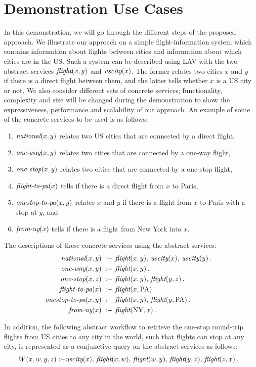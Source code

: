 \documentclass{llncs}
\newcommand{\qrule}{:\!\!-}
\newcommand{\flight}{\text{\it flight}}
\newcommand{\UScity}{\text{\it uscity}}
\newcommand{\national}{\text{\it national}}
\newcommand{\oneway}{\text{\it one-way}}
\newcommand{\onestop}{\text{\it one-stop}}
\newcommand{\flightPA}{\text{\it flight-to-pa}}
\newcommand{\onestopPA}{\text{\it onestop-to-pa}}
\newcommand{\fromNY}{\text{\it from-ny}}
\newcommand{\PA}{\text{PA}}
\newcommand{\NY}{\text{NY}}
\begin{document}
\section{Demonstration Use Cases}
In this demonstration, we will go through the different steps of the proposed approach.
We illustrate our approach on  a simple flight-information system which contains information
about flights between cities and information about which cities are in
the US. Such a system can be described using LAV with the two abstract
services $\flight(x,y)$ and $\UScity(x)$. The former relates two cities
$x$ and $y$ if there is a direct flight between them, and the latter tells
whether $x$ is a US city or not. We also consider different sets of concrete services; functionality, complexity and size will be changed during the demonstration to show
the expressiveness, performance and scalability of our approach. An example of some of the concrete services to be used is as follows:
\begin{enumerate}[--]
\item $\national(x,y)$ relates two US cities that are connected by a direct flight,
\item $\oneway(x,y)$ relates two cities that are connected by a one-way flight,
\item $\onestop(x,y)$ relates two cities that are connected by a one-stop flight,
\item $\flightPA(x)$ tells if there is a direct flight from $x$ to Paris,
\item $\onestopPA(x,y)$ relates $x$ and $y$ if there is a flight from $x$ to Paris
      with a stop at $y$, and
\item $\fromNY(x)$ tells if there is a flight from New York into $x$.
\end{enumerate}
The descriptions of these concrete services using the abstract services:
\begin{alignat*}{1}
\national(x,y)\   &\qrule\ \flight(x,y),\,\UScity(x),\,\UScity(y)\,. \\
\oneway(x,y)\     &\qrule\ \flight(x,y)\,. \\
\onestop(x,z)\    &\qrule\ \flight(x,y),\,\flight(y,z)\,. \\
\flightPA(x)\     &\qrule\ \flight(x,\PA)\,. \\
\onestopPA(x,y)\  &\qrule\ \flight(x,y),\,\flight(y,\PA)\,. \\
\fromNY(x)\       &\qrule\ \flight(\NY,x)\,.
\end{alignat*}

In addition, the following abstract workflow to retrieve
the one-stop round-trip flights from US cities to any city in the world, such that
flights can stop at any city, is represented as a conjunctive query on the abstract services as follows: 
\[ W(x,w,y,z) \qrule \UScity(x),\,\flight(x,w),\,\flight(w,y),\,\flight(y,z),\,\flight(z,x)\,. \]
\end{document}
